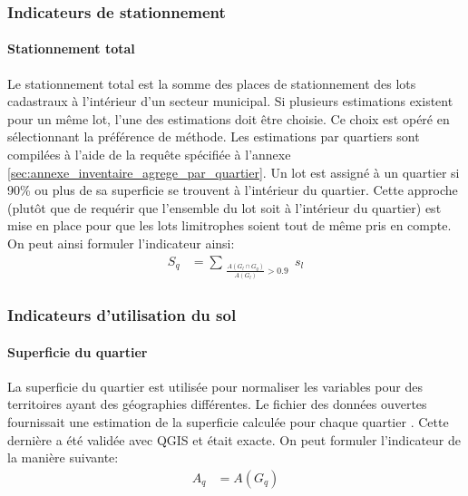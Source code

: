        \subsubsection{Indicateurs de stationnement}
            \paragraph{Stationnement total} Le stationnement total est la somme des places de stationnement des lots cadastraux à l'intérieur d'un secteur municipal. Si plusieurs estimations existent pour un même lot, l'une des estimations doit être choisie. Ce choix est opéré en sélectionnant la préférence de méthode. Les estimations par quartiers sont compilées à l'aide de la requête spécifiée à l'annexe \ref{sec:annexe_inventaire_agrege_par_quartier}. Un lot est assigné à un quartier si 90\% ou plus de sa superficie se trouvent à l'intérieur du quartier. Cette approche (plutôt que de requérir que l'ensemble du lot soit à l'intérieur du quartier) est mise en place pour que les lots limitrophes soient tout de même pris en compte. On peut ainsi formuler l'indicateur ainsi:
                \begin{align}
                    S_q &= \sum_{\substack{\frac{A\left(G_l\cap G_q\right)}{A\left(G_l\right)}>0.9}}{s_l} 
                    \label{eq:stat-tot}
                \end{align}
        \subsubsection{Indicateurs d'utilisation du sol}
            \paragraph{Superficie du quartier} La superficie du quartier est utilisée pour normaliser les variables pour des territoires ayant des géographies différentes. Le fichier des données ouvertes fournissait une estimation de la superficie calculée pour chaque quartier \parencite{ville_de_quebec_quartiers_2024}. Cette dernière a été validée avec QGIS et était exacte. On peut formuler l'indicateur de la manière suivante:
            \begin{align}
                A_q &= A(G_q) \label{eq:superf}
            \end{align}
